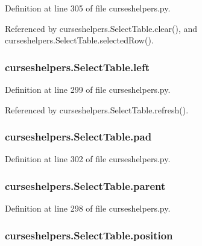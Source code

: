 Definition at line 305 of file curseshelpers.\-py.



Referenced by curseshelpers.\-Select\-Table.\-clear(), and curseshelpers.\-Select\-Table.\-selected\-Row().

\subsubsection[{left}]{\setlength{\rightskip}{0pt plus 5cm}curseshelpers.\-Select\-Table.\-left}\label{classcurseshelpers_1_1SelectTable_a3a7504a36bba5c51821631eb8b2f9bb0}


Definition at line 299 of file curseshelpers.\-py.



Referenced by curseshelpers.\-Select\-Table.\-refresh().

\subsubsection[{pad}]{\setlength{\rightskip}{0pt plus 5cm}curseshelpers.\-Select\-Table.\-pad}\label{classcurseshelpers_1_1SelectTable_a5367ecb7d4b9fec66f780256d3782518}


Definition at line 302 of file curseshelpers.\-py.

\subsubsection[{parent}]{\setlength{\rightskip}{0pt plus 5cm}curseshelpers.\-Select\-Table.\-parent}\label{classcurseshelpers_1_1SelectTable_a8b9ac49716dde720352ae0c90742dd61}


Definition at line 298 of file curseshelpers.\-py.

\subsubsection[{position}]{\setlength{\rightskip}{0pt plus 5cm}curseshelpers.\-Select\-Table.\-position}\label{classcurseshelpers_1_1SelectTable_aa1cb943b3c1d9073c244e1e279a6bffa}


